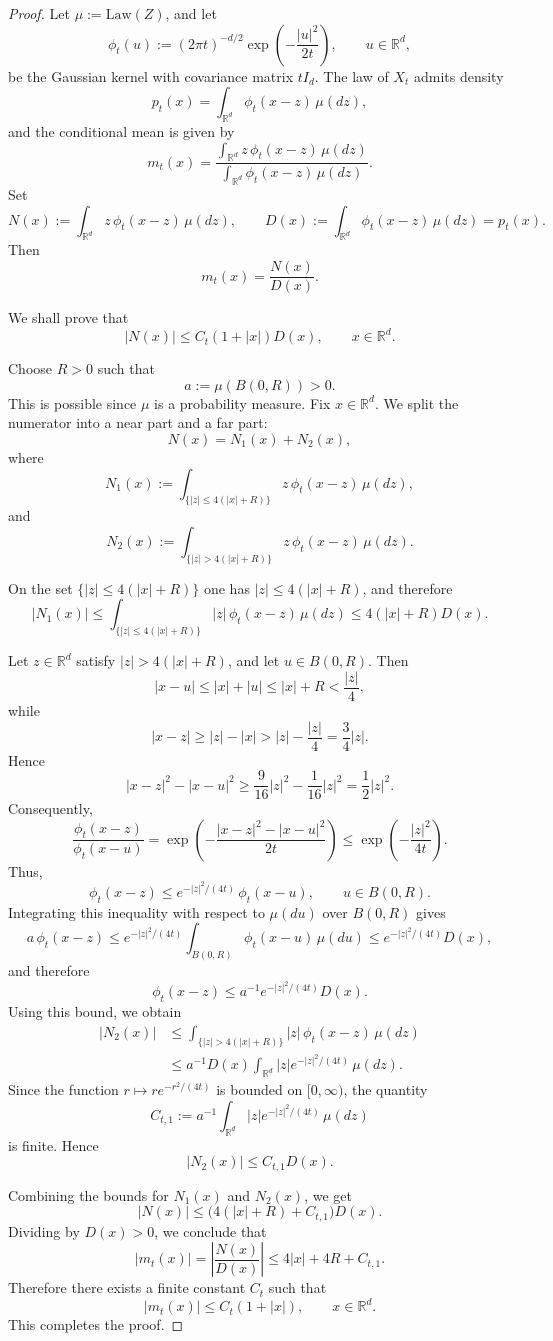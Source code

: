 \documentclass[twoside,11pt]{article}
\numberwithin{equation}{section}
\begin{document}
\begin{proof}
Let $\mu:=\mathrm{Law}(Z)$, and let
\[
\phi_t(u):=(2\pi t)^{-d/2}\exp\!\left(-\frac{|u|^2}{2t}\right),\qquad u\in\mathbb R^d,
\]
be the Gaussian kernel with covariance matrix $tI_d$. The law of $X_t$ admits density
\[
p_t(x)=\int_{\mathbb R^d}\phi_t(x-z)\,\mu(dz),
\]
and the conditional mean is given by
\[
m_t(x)
=
\frac{\int_{\mathbb R^d} z\,\phi_t(x-z)\,\mu(dz)}
{\int_{\mathbb R^d}\phi_t(x-z)\,\mu(dz)}.
\]
Set
\[
N(x):=\int_{\mathbb R^d} z\,\phi_t(x-z)\,\mu(dz),
\qquad
D(x):=\int_{\mathbb R^d}\phi_t(x-z)\,\mu(dz)=p_t(x).
\]
Then
\[
m_t(x)=\frac{N(x)}{D(x)}.
\]

We shall prove that
\[
|N(x)|\le C_t(1+|x|)D(x),\qquad x\in\mathbb R^d.
\]

Choose $R>0$ such that
\[
a:=\mu(B(0,R))>0.
\]
This is possible since $\mu$ is a probability measure. Fix $x\in\mathbb R^d$. We split the numerator into a near part and a far part:
\[
N(x)=N_1(x)+N_2(x),
\]
where
\[
N_1(x):=\int_{\{|z|\le 4(|x|+R)\}} z\,\phi_t(x-z)\,\mu(dz),
\]
and
\[
N_2(x):=\int_{\{|z|>4(|x|+R)\}} z\,\phi_t(x-z)\,\mu(dz).
\]

\medskip

On the set $\{|z|\le 4(|x|+R)\}$ one has $|z|\le 4(|x|+R)$, and therefore
\[
|N_1(x)|
\le \int_{\{|z|\le 4(|x|+R)\}} |z|\,\phi_t(x-z)\,\mu(dz)
\le 4(|x|+R)D(x).
\]

\medskip

Let $z\in\mathbb R^d$ satisfy $|z|>4(|x|+R)$, and let $u\in B(0,R)$. Then
\[
|x-u|\le |x|+|u|\le |x|+R<\frac{|z|}{4},
\]
while
\[
|x-z|\ge |z|-|x|>|z|-\frac{|z|}{4}=\frac{3}{4}|z|.
\]
Hence
\[
|x-z|^2-|x-u|^2
\ge \frac{9}{16}|z|^2-\frac{1}{16}|z|^2
=\frac12 |z|^2.
\]
Consequently,
\[
\frac{\phi_t(x-z)}{\phi_t(x-u)}
=
\exp\!\left(-\frac{|x-z|^2-|x-u|^2}{2t}\right)
\le \exp\!\left(-\frac{|z|^2}{4t}\right).
\]
Thus,
\[
\phi_t(x-z)\le e^{-|z|^2/(4t)}\,\phi_t(x-u),\qquad u\in B(0,R).
\]
Integrating this inequality with respect to $\mu(du)$ over $B(0,R)$ gives
\[
a\,\phi_t(x-z)
\le e^{-|z|^2/(4t)}\int_{B(0,R)}\phi_t(x-u)\,\mu(du)
\le e^{-|z|^2/(4t)}D(x),
\]
and therefore
\[
\phi_t(x-z)\le a^{-1}e^{-|z|^2/(4t)}D(x).
\]
Using this bound, we obtain
\begin{align*}
|N_2(x)|
&\le \int_{\{|z|>4(|x|+R)\}} |z|\,\phi_t(x-z)\,\mu(dz)\\
&\le a^{-1}D(x)\int_{\mathbb R^d}|z|e^{-|z|^2/(4t)}\,\mu(dz).
\end{align*}
Since the function $r\mapsto re^{-r^2/(4t)}$ is bounded on $[0,\infty)$, the quantity
\[
C_{t,1}:=a^{-1}\int_{\mathbb R^d}|z|e^{-|z|^2/(4t)}\,\mu(dz)
\]
is finite. Hence
\[
|N_2(x)|\le C_{t,1}D(x).
\]

\medskip
Combining the bounds for $N_1(x)$ and $N_2(x)$, we get
\[
|N(x)|
\le \bigl(4(|x|+R)+C_{t,1}\bigr)D(x).
\]
Dividing by $D(x)>0$, we conclude that
\[
|m_t(x)|
=
\left|\frac{N(x)}{D(x)}\right|
\le 4|x|+4R+C_{t,1}.
\]
Therefore there exists a finite constant $C_t$ such that
\[
|m_t(x)|\le C_t(1+|x|),\qquad x\in\mathbb R^d.
\]
This completes the proof.
\end{proof}
\end{document}
